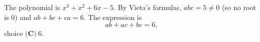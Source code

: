 The polynomial is $x^3+x^2+6x-5$. By Vieta's formulas, $abc=5\ne0$ (so no root is $0$) and $ab+bc+ca=6$. The expression is
\[ab+ac+bc=6,\]
choice $\boxed{\textbf{(C)}\ 6}$.
